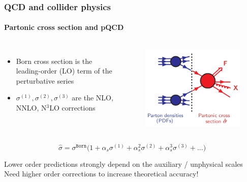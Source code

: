 \documentclass[aspectratio=43]{beamer}
\begin{document}
\begin{frame}
	
	\frametitle{QCD and collider physics}
	\framesubtitle{Partonic cross section and pQCD}
	
	\footnotesize
	
	\begin{columns}
	
	
	\begin{itemize}
		\item Born cross section is the leading-order (LO) term of the perturbative series
		\item $\sigma^{(1)}, \sigma^{(2)}, \sigma^{(3)}$ are the NLO, NNLO, N$^{3}$LO corrections
	\end{itemize}
	
	
	\begin{figure}[!htb]
		\includegraphics[width = 5 cm]{plots/part1/chapter2/factorization_3.png}
	\end{figure}
	
	\end{columns}
	
	\begin{equation}
		\hat{\sigma} = \sigma^{\texttt{Born}} \Big( 1 +
		\alpha_{s} \sigma^{(1)} + 
		\alpha_{s}^{2} \sigma^{(2)} + 
		\alpha_{s}^{3} \sigma^{(3)} + ... \Big) \nonumber
	\end{equation}
	
	\footnotesize Lower order predictions strongly depend on the auxiliary / unphysical scales \\ {\color{red}Need higher order corrections to increase theoretical accuracy!}

\end{frame}
\end{document}
